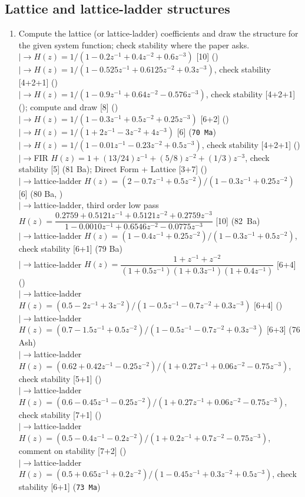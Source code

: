 \documentclass[12pt]{article}
\newcommand{\lb}{\\$\left|\rightarrow\right.$}
\begin{document}
  \subsection{Lattice and lattice-ladder structures}
    \begin{enumerate}[topsep=0pt, noitemsep]
      \item Compute the lattice (or lattice-ladder) coefficients and draw the structure for the given system function; check stability where the paper asks.
        \lb $H(z)=1/(1-0.2z^{-1}+0.4z^{-2}+0.6z^{-3})$ \hfill [10] ()
        \lb $H(z)=1/(1-0.525z^{-1}+0.6125z^{-2}+0.3z^{-3})$, check stability \hfill [4+2+1] ()
        \lb $H(z)=1/(1-0.9z^{-1}+0.64z^{-2}-0.576z^{-3})$, check stability \hfill [4+2+1] (); compute and draw \hfill [8] ()
        \lb $H(z)=1/(1-0.3z^{-1}+0.5z^{-2}+0.25z^{-3})$ \hfill [6+2] ()
        \lb $H(z)=1/(1+2z^{-1}-3z^{-2}+4z^{-3})$ \hfill [6] (\texttt{70 Ma})
        \lb $H(z)=1/(1-0.01z^{-1}-0.23z^{-2}+0.5z^{-3})$, check stability \hfill [4+2+1] ()
        \lb FIR $H(z)=1+(13/24)z^{-1}+(5/8)z^{-2}+(1/3)z^{-3}$, check stability \hfill [5] (81 Ba); Direct Form + Lattice \hfill [3+7] ()
        \lb lattice-ladder $H(z)=(2-0.7z^{-1}+0.5z^{-2})/(1-0.3z^{-1}+0.25z^{-2})$ \hfill [6] (80 Ba, )
        \lb lattice-ladder, third order low pass $H(z)=\dfrac{0.2759+0.5121z^{-1}+0.5121z^{-2}+0.2759z^{-3}}{1-0.0010z^{-1}+0.6546z^{-2}-0.0775z^{-3}}$ \hfill [10] \mbox{(82 Ba)}
        \lb lattice-ladder $H(z)=(1-0.4z^{-1}+0.25z^{-2})/(1-0.3z^{-1}+0.5z^{-2})$, check stability \hfill [6+1] (79 Ba)
        \lb lattice-ladder $H(z)=\dfrac{1+z^{-1}+z^{-2}}{(1+0.5z^{-1})(1+0.3z^{-1})(1+0.4z^{-1})}$ \hfill [6+4] ()
        \lb lattice-ladder $H(z)=(0.5-2z^{-1}+3z^{-2})/(1-0.5z^{-1}-0.7z^{-2}+0.3z^{-3})$ \hfill [6+4] ()
        \lb lattice-ladder $H(z)=(0.7-1.5z^{-1}+0.5z^{-2})/(1-0.5z^{-1}-0.7z^{-2}+0.3z^{-3})$ \hfill [6+3] (76 Ash)
        \lb lattice-ladder $H(z)=(0.62+0.42z^{-1}-0.25z^{-2})/(1+0.27z^{-1}+0.06z^{-2}-0.75z^{-3})$, check stability \hfill [5+1] ()
        \lb lattice-ladder $H(z)=(0.6-0.45z^{-1}-0.25z^{-2})/(1+0.27z^{-1}+0.06z^{-2}-0.75z^{-3})$, check stability \hfill [7+1] ()
        \lb lattice-ladder $H(z)=(0.5-0.4z^{-1}-0.2z^{-2})/(1+0.2z^{-1}+0.7z^{-2}-0.75z^{-3})$, comment on stability \hfill [7+2] ()
        \lb lattice-ladder $H(z)=(0.5+0.65z^{-1}+0.2z^{-2})/(1-0.45z^{-1}+0.3z^{-2}+0.5z^{-3})$, check stability \hfill [6+1] (\texttt{73 Ma})

\end{enumerate}
\end{document}

